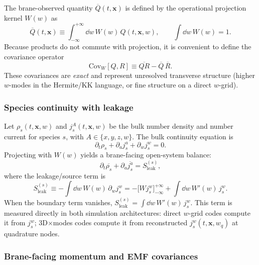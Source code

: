 \documentclass[11pt]{article}
\begin{document}
The brane-observed quantity \(\overline{Q}(t,\mathbf{x})\) is defined by the operational
projection kernel \(W(w)\) as
\begin{equation}
\overline{Q}(t,\mathbf{x}) \equiv \int_{-\infty}^{+\infty}\dd w\,W(w)\,Q(t,\mathbf{x},w),
\qquad
\int \dd w\,W(w)=1.
\label{eq:proj_def_beyond}
\end{equation}
Because products do not commute with projection, it is convenient to define the covariance
operator
\begin{equation}
\mathrm{Cov}_W[Q,R] \equiv \overline{QR}-\overline{Q}\,\overline{R}.
\label{eq:cov_def_beyond}
\end{equation}
These covariances are \emph{exact} and represent unresolved transverse structure (higher
\(w\)-modes in the Hermite/KK language, or fine structure on a direct \(w\)-grid).

\subsubsection*{Species continuity with leakage}

Let \(\rho_s(t,\mathbf{x},w)\) and \(j_s^A(t,\mathbf{x},w)\) be the bulk number density and
number current for species \(s\), with \(A\in\{x,y,z,w\}\). The bulk continuity equation is
\begin{equation}
\partial_t \rho_s + \partial_a j_s^a + \partial_w j_s^w = 0.
\label{eq:bulk_species_cont_beyond}
\end{equation}
Projecting with \(W(w)\) yields a brane-facing open-system balance:
\begin{equation}
\partial_t \overline{\rho_s} + \partial_a \overline{j_s^a}
=
S_{\mathrm{leak}}^{(s)},
\label{eq:proj_species_cont_beyond}
\end{equation}
where the leakage/source term is
\begin{equation}
S_{\mathrm{leak}}^{(s)}
\equiv
- \int \dd w\,W(w)\,\partial_w j_s^w
=
-\Big[W j_s^w\Big]_{-\infty}^{+\infty}
+\int \dd w\,W'(w)\,j_s^w.
\label{eq:Sleak_def_beyond}
\end{equation}
When the boundary term vanishes, \(S_{\mathrm{leak}}^{(s)}=\int \dd w\,W'(w)\,j_s^w\).
This term is measured directly in both simulation architectures:
direct \(w\)-grid codes compute it from \(j_s^w\); 3D\(\times\)modes codes compute it
from reconstructed \(j_s^w(t,\mathbf{x},w_q)\) at quadrature nodes.

\subsubsection*{Brane-facing momentum and EMF covariances}
\end{document}
